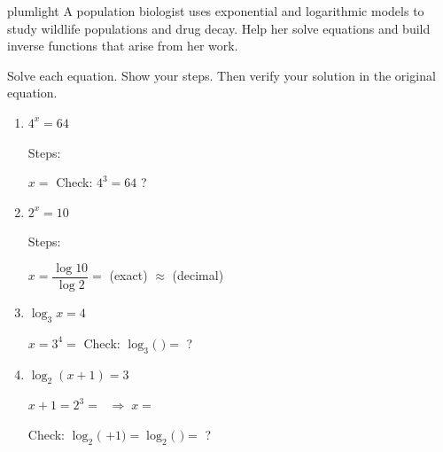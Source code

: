 \documentclass[10pt]{article}
\begin{document}
\namepartnerperiod

\vspace{0.08in}

\begin{scenariobox}{plumlight}
A population biologist uses exponential and logarithmic models to study wildlife populations
and drug decay. Help her solve equations and build inverse functions that arise from her work.
\end{scenariobox}

\vspace{0.08in}

\begin{tcolorbox}[colback=white, colframe=black!40,
    title=\textbf{Tier R --- Remediate},
    fonttitle=\bfseries, arc=2mm, left=3mm, right=3mm, top=2mm, bottom=2mm]

Solve each equation. Show your steps. Then verify your solution in the original equation.

\begin{enumerate}[leftmargin=1.8em, itemsep=10pt]

\item $4^x = 64$

\vspace{6pt}
Steps: 

$x = $  \qquad Check: $4^{3} = 64$ \checkmark? 

\item $2^x = 10$

\vspace{6pt}
Steps: 

$x = \dfrac{\log 10}{\log 2} = $  (exact) $\approx$  (decimal)

\item $\log_3 x = 4$

\vspace{6pt}
$x = 3^4 = $  \qquad Check: $\log_3($  $) = $  \checkmark? 

\item $\log_2(x+1) = 3$

\vspace{6pt}
$x + 1 = 2^3 = $  $\;\Rightarrow\; x = $ 

Check: $\log_2($  $+ 1) = \log_2($  $) = $  \checkmark? 

\end{enumerate}
\end{tcolorbox}
\end{document}
